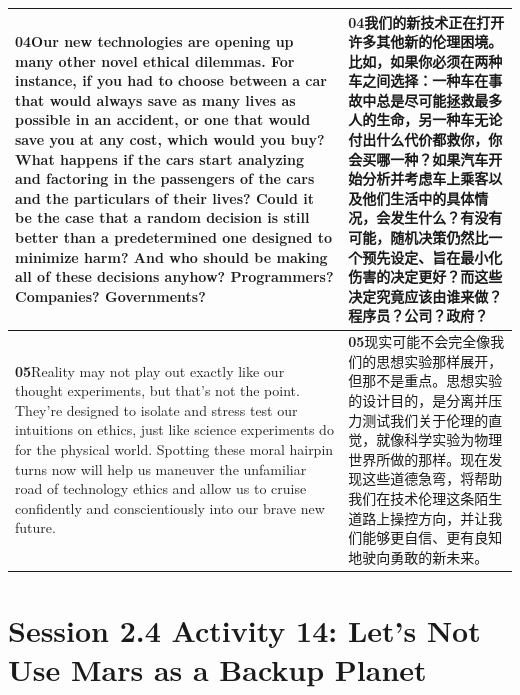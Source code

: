 \documentclass[UTF8,zihao=-4,fontset=fandol]{ctexart}
\newcommand{\TranscriptColumn}{\raggedright\arraybackslash\hyphenpenalty=10000\exhyphenpenalty=10000\sloppy}
\begin{document}
\begin{longtable}{>{\TranscriptColumn}p{} >{\TranscriptColumn}p{}}
\textbf{04}\quad Our new technologies are opening up many other novel ethical dilemmas. For instance, if you had to choose between a car that would always save as many lives as possible in an accident, or one that would save you at any cost, which would you buy? What happens if the cars start analyzing and factoring in the passengers of the cars and the particulars of their lives? Could it be the case that a random decision is still better than a predetermined one designed to minimize harm? And who should be making all of these decisions anyhow? Programmers? Companies? Governments? & \textbf{04}\quad 我们的新技术正在打开许多其他新的伦理困境。比如，如果你必须在两种车之间选择：一种车在事故中总是尽可能拯救最多人的生命，另一种车无论付出什么代价都救你，你会买哪一种？如果汽车开始分析并考虑车上乘客以及他们生活中的具体情况，会发生什么？有没有可能，随机决策仍然比一个预先设定、旨在最小化伤害的决定更好？而这些决定究竟应该由谁来做？程序员？公司？政府？ \\ \hline
\textbf{05}\quad Reality may not play out exactly like our thought experiments, but that's not the point. They're designed to isolate and stress test our intuitions on ethics, just like science experiments do for the physical world. Spotting these moral hairpin turns now will help us maneuver the unfamiliar road of technology ethics and allow us to cruise confidently and conscientiously into our brave new future. & \textbf{05}\quad 现实可能不会完全像我们的思想实验那样展开，但那不是重点。思想实验的设计目的，是分离并压力测试我们关于伦理的直觉，就像科学实验为物理世界所做的那样。现在发现这些道德急弯，将帮助我们在技术伦理这条陌生道路上操控方向，并让我们能够更自信、更有良知地驶向勇敢的新未来。 \\ \hline
\end{longtable}


\clearpage
\section{Session 2.4 Activity 14: Let's Not Use Mars as a Backup Planet}
\end{document}
